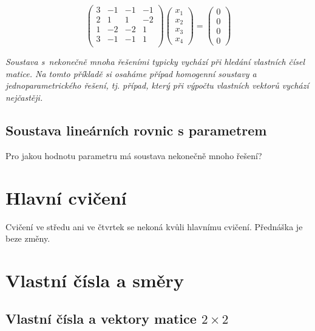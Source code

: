 \begin{equation*}
  \begin{pmatrix}
3 &-1 &-1 &-1\\ 
2 &1 &1 &-2 \\
1 &-2 &-2 &1 \\
3 &-1 &-1 &1 \\
\end{pmatrix}
\begin{pmatrix}
  x_1 \\ x_2 \\x_3\\x_4
\end{pmatrix}
=
\begin{pmatrix}
  0 \\ 0 \\0\\0
\end{pmatrix}
\end{equation*}

\textit{Soustava s nekonečně mnoha řešeními typicky vychází při
  hledání vlastních čísel matice. Na tomto příkladě si osaháme případ
  homogenní soustavy a jednoparametrického řešení, tj. případ, který
  při výpočtu vlastních vektorů vychází nejčastěji.}


\subsection{Soustava lineárních rovnic s parametrem}
Pro jakou hodnotu parametru má soustava nekonečně mnoho řešení?

\stranka


\stranka
\section{Hlavní cvičení}
Cvičení ve středu ani ve čtvrtek se nekoná kvůli hlavnímu cvičení. Přednáška je beze změny.


\stranka
\section{Vlastní čísla a směry}



\stranka
\subsection{Vlastní čísla a vektory matice $2\times 2$}

